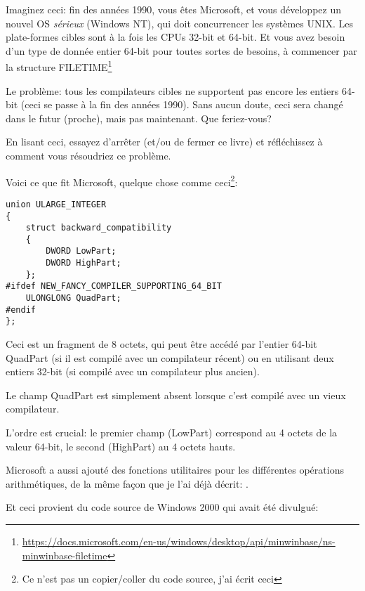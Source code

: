 \label{LargeInteger}

Imaginez ceci: fin des années 1990, vous êtes Microsoft, et vous développez un
nouvel \ac{OS} \emph{sérieux} (Windows NT), qui doit concurrencer les systèmes UNIX.
Les plate-formes cibles sont à la fois les CPUs 32-bit et 64-bit.
Et vous avez besoin d'un type de donnée entier 64-bit pour toutes sortes de besoins,
à commencer par la structure FILETIME\footnote{\url{https://docs.microsoft.com/en-us/windows/desktop/api/minwinbase/ns-minwinbase-filetime}}

Le problème: tous les compilateurs \CCpp cibles ne supportent pas encore les entiers
64-bit (ceci se passe à la fin des années 1990).
Sans aucun doute, ceci sera changé dans le futur (proche), mais pas maintenant.
Que feriez-vous?

En lisant ceci, essayez d'arrêter (et/ou de fermer ce livre) et réfléchissez à
comment vous résoudriez ce problème.

\clearpage

Voici ce que fit Microsoft, quelque chose comme ceci\footnote{Ce n'est pas un copier/coller
du code source, j'ai écrit ceci}:

\begin{lstlisting}
union ULARGE_INTEGER
{
    struct backward_compatibility
    {
        DWORD LowPart;
        DWORD HighPart;
    };
#ifdef NEW_FANCY_COMPILER_SUPPORTING_64_BIT
    ULONGLONG QuadPart;
#endif
};
\end{lstlisting}

Ceci est un fragment de 8 octets, qui peut être accédé par l'entier 64-bit QuadPart
(si il est compilé avec un compilateur récent) ou en utilisant deux entiers 32-bit
(si compilé avec un compilateur plus ancien).

Le champ QuadPart est simplement absent lorsque c'est compilé avec un vieux compilateur.

L'ordre est crucial: le premier champ (LowPart) correspond au 4 octets de la valeur
64-bit, le second (HighPart) au 4 octets hauts.

Microsoft a aussi ajouté des fonctions utilitaires pour les différentes opérations
arithmétiques, de la même façon que je l'ai déjà décrit:
.

Et ceci provient du code source de Windows 2000 qui avait été divulgué:

